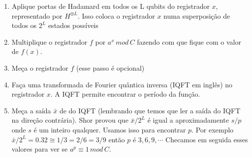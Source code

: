 \documentclass[12pt,a4paper]{article}
\begin{document}
\begin{enumerate}
\item Aplique portas de Hadamard em todos os L qubits do registrador $x$, representado por $H^{\otimes L}$. Isso coloca o registrador $x$ numa superposição de todos os $2^{L}$ estados possíveis

\item Multiplique o registrador $f$ por $a^{x} \, mod \, C$ fazendo com que fique com o valor de $f(x)$.

\item Meça o registrador $f$ (esse passo é opcional)

\item Faça uma transformada de Fourier quântica inversa (IQFT em inglês) no registrador $x$. A IQFT permite encontrar o período da função.

\item Meça a saída $\bar{x}$ de do IQFT (lembrando que temos que ler a saída do IQFT na direção contrária).  Shor provou que $\bar{x}/2^{L}$ é igual a aproximadamente $s/p$ onde $s$ é um inteiro qualquer. Usamos isso para encontrar $p$. Por exemplo $\bar{x}/2^{L} = 0.32 \cong 1/3 = 2/6 = 3/9$ então $p$ é $3, 6, 9, \cdots$ Checamos em seguida esses valores para ver se $a^{p} \equiv 1\, mod\, C$.

\end{enumerate}
\end{document}

